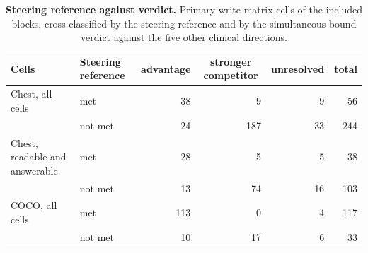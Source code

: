 \begin{table}[t]
\centering
\small
\setlength{\tabcolsep}{4pt}
\caption{\textbf{Steering reference against verdict.} Primary write-matrix cells of the included blocks, cross-classified by the steering reference and by the simultaneous-bound verdict against the five other clinical directions.}
\label{tab:cf-contingency}
\begin{tabular}{llrrrr}
\toprule
Cells & Steering reference & \multicolumn{1}{c}{advantage} & \multicolumn{1}{c}{stronger competitor} & \multicolumn{1}{c}{unresolved} & \multicolumn{1}{c}{total}\\
\midrule
Chest, all cells & met & 38 & 9 & 9 & 56 \\
 & not met & 24 & 187 & 33 & 244 \\
Chest, readable and answerable & met & 28 & 5 & 5 & 38 \\
 & not met & 13 & 74 & 16 & 103 \\
COCO, all cells & met & 113 & 0 & 4 & 117 \\
 & not met & 10 & 17 & 6 & 33 \\
\bottomrule
\end{tabular}
\end{table}
